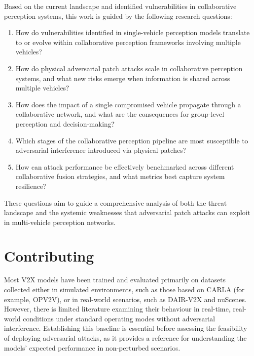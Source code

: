 Based on the current landscape and identified vulnerabilities in collaborative perception systems, this work is guided by the following research questions:
\begin{enumerate}
    \item How do vulnerabilities identified in single-vehicle perception models translate to or evolve within collaborative perception frameworks involving multiple vehicles?
    \item How do physical adversarial patch attacks scale in collaborative perception systems, and what new risks emerge when information is shared across multiple vehicles?
    \item How does the impact of a single compromised vehicle propagate through a collaborative network, and what are the consequences for group-level perception and decision-making?
    \item Which stages of the collaborative perception pipeline are most susceptible to adversarial interference introduced via physical patches?
    \item How can attack performance be effectively benchmarked across different collaborative fusion strategies, and what metrics best capture system resilience?
\end{enumerate}
These questions aim to guide a comprehensive analysis of both the threat landscape and the systemic weaknesses that adversarial patch attacks can exploit in multi-vehicle perception networks.

\section{Contributing}

Most V2X models have been trained and evaluated primarily on datasets collected either in simulated environments, such as those based on CARLA (for example, OPV2V\cite{xu2022opv2vopenbenchmarkdataset}), or in real-world scenarios, such as DAIR-V2X\cite{DAIR-V2X2021} and nuScenes\cite{nuscenes2019}.
However, there is limited literature examining their behaviour in real-time, real-world conditions under standard operating modes without adversarial interference.
Establishing this baseline is essential before assessing the feasibility of deploying adversarial attacks, as it provides a reference for understanding the models’ expected performance in non-perturbed scenarios.

